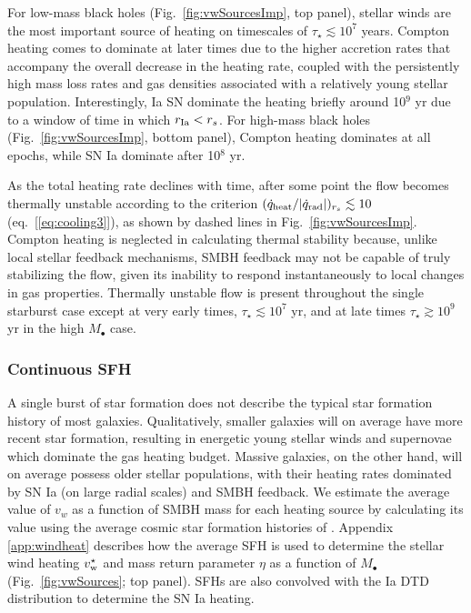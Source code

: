 \documentclass[usenatbib,fleqn]{mn2e}
\newcommand{\rs}{r_s}
\newcommand{\vwO}{v_{w}}
\begin{document}
For low-mass black holes (Fig.~\ref{fig:vwSourcesImp}, top panel),
stellar winds are the most important source of heating on timescales
of $\tau_{\star} \lesssim 10^{7}$ years.  Compton heating comes to
dominate at later times due to the higher accretion rates that
accompany the overall decrease in the heating rate, coupled with the
persistently high mass loss rates and gas densities associated with a
relatively young stellar population.  Interestingly, Ia SN dominate
the heating briefly around 10$^{9}$ yr due to a window of time in
which $r_{ \rm Ia} < \rs$.  For high-mass black holes
(Fig.~\ref{fig:vwSourcesImp}, bottom panel), Compton heating dominates
at all epochs, while SN Ia dominate after 10$^{8}$ yr.

As the total heating rate declines with time, after some point the
flow becomes thermally unstable according to the criterion
$(\dot{q}_{\rm heat}/|\dot{q}_{\rm rad}|)_{r_{s}} \lesssim 10$
(eq.~[\ref{eq:cooling3}]), as shown by dashed lines in
Fig.~\ref{fig:vwSourcesImp}.  Compton heating is neglected in
calculating thermal stability because, unlike local stellar feedback
mechanisms, SMBH feedback may not be capable of truly stabilizing the
flow, given its inability to respond instantaneously to local changes
in gas properties.  Thermally unstable flow is present
throughout the single starburst case except at very early times,
$\tau_{\star} \lesssim 10^7$ yr, and at late times $\tau_{\star}
\gtrsim 10^{9}$ yr in the high $M_{\bullet}$ case.

\subsubsection{Continuous SFH}
A single burst of star formation does not describe the typical star
formation history of most galaxies.  Qualitatively, smaller galaxies
will on average have more recent star formation, resulting in
energetic young stellar winds and supernovae which dominate the gas
heating budget.  Massive galaxies, on the other hand, will on average
possess older stellar populations, with their heating rates dominated
by SN Ia (on large radial scales) and SMBH feedback.  We estimate the
average value of $\vwO$ as a function of SMBH mass for each heating
source by calculating its value using the average cosmic star
formation histories of \citet{MosterNaab+:2013a}.  Appendix
\ref{app:windheat} describes how the average SFH is
used to determine the stellar wind heating $v_{\rm w}^{\star}$ and
mass return parameter $\eta$ as a function of $M_{\bullet}$
(Fig.~\ref{fig:vwSources}; top panel).  SFHs are also
convolved with the Ia DTD distribution to determine the SN Ia heating.
\end{document}
